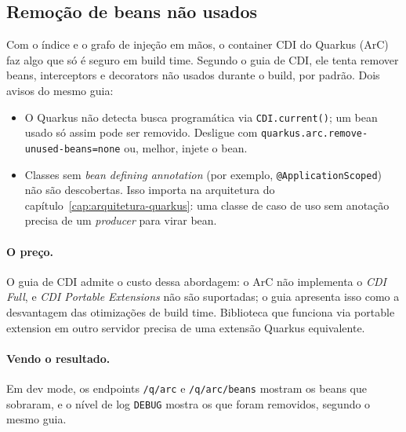 \subsection*{Remoção de beans não usados}

Com o índice e o grafo de injeção em mãos, o container CDI do Quarkus
(ArC) faz algo que só é seguro em build time. Segundo o guia de CDI, ele
tenta remover beans, interceptors e decorators não usados durante o
build, por padrão. Dois avisos do mesmo guia:
\begin{itemize}
\item O Quarkus não detecta busca programática via \texttt{CDI.current()};
  um bean usado só assim pode ser removido. Desligue com
  \texttt{quarkus.arc.remove-unused-beans=none} ou, melhor, injete o bean.
\item Classes sem \emph{bean defining annotation} (por exemplo,
  \texttt{@ApplicationScoped}) não são descobertas. Isso importa na
  arquitetura do capítulo~\ref{cap:arquitetura-quarkus}: uma classe de
  caso de uso sem anotação precisa de um \emph{producer} para virar bean.
\end{itemize}

\paragraph{O preço.}
O guia de CDI admite o custo dessa abordagem: o ArC não implementa o
\emph{CDI Full}, e \emph{CDI Portable Extensions} não são suportadas;
o guia apresenta isso como a desvantagem das otimizações de build time.
Biblioteca que
funciona via portable extension em outro servidor precisa de uma
extensão Quarkus equivalente.

\paragraph{Vendo o resultado.}
Em dev mode, os endpoints \texttt{/q/arc} e \texttt{/q/arc/beans} mostram
os beans que sobraram, e o nível de log \texttt{DEBUG} mostra os que foram
removidos, segundo o mesmo guia.
